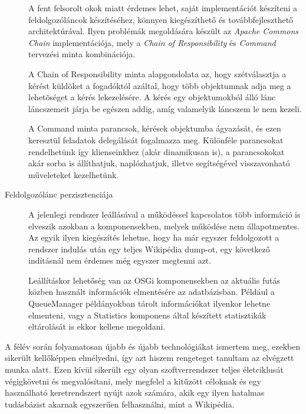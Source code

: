 \begin{description}
A fent felsorolt okok miatt érdemes lehet, saját implementációt készíteni a feldolgozóláncok készítéséhez, könnyen kiegészíthető és továbbfejleszthető architektúrával. Ilyen problémák megoldására készült az \textit{Apache Commons Chain} \cite{commonschain} implementációja, mely a \textit{Chain of Responsibility} és \textit{Command} tervezési minta kombinációja.
    
A Chain of Responsibility minta alapgondolata az, hogy szétválasztja a kérést küldõket a fogadóktól azáltal, hogy több objektumnak adja meg a lehetõséget a kérés lekezelésére. A kérés egy objektumokból álló lánc láncszemeit járja be egészen addig, amíg valamelyik láncszem le nem kezeli.
    
A Command minta parancsok, kérések objektumba ágyazását, és ezen keresztül feladatok delegálását fogalmazza meg. Különféle parancsokat rendelhetünk így klienseinkhez (akár dinamikusan is), a parancsokokat akár sorba is állíthatjuk, naplózhatjuk, illetve segítségével visszavonható műveleteket kezelhetünk.
    
    \item[Feldolgozólánc perzisztenciája]

A jelenlegi rendszer leállásával a működéssel kapcsolatos több információ is elveszik azokban a komponensekben, melyek működése nem állapotmentes. Az egyik ilyen kiegészítés lehetne, hogy ha már egyszer feldolgozott a rendszer indulás után egy teljes Wikipédia dump-ot, egy következő indításnál nem érdemes még egyszer megtenni azt.

Leállításkor lehetőség van az OSGi komponensekben az aktuális futás közben használt információk elmentésére az adatbázisban. Például a QueueManager példányokban tárolt információkat ilyenkor lehetne elmenteni, vagy a Statistics komponens által készített statisztikák eltárolását is ekkor kellene megoldani.
\end{description}

A félév során folyamatosan újabb és újabb technológiákat ismertem meg, ezekben sikerült kellőképpen elmélyedni, így azt hiszem rengeteget tanultam az elvégzett munka alatt. Ezen kívül sikerült egy olyan szoftverrendszer teljes életciklusát végigkövetni és megvalósítani, mely megfelel a kitűzött céloknak és egy használható keretrendszert nyújt azok számára, akik egy ilyen hatalmas tudásbázist akarnak egyszerűen felhasználni, mint a Wikipédia.

